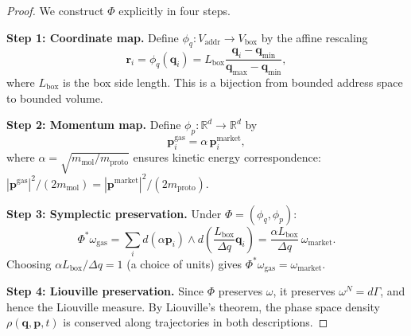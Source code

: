 \documentclass[twocolumn,10pt]{article}
\theoremstyle{remark}
\newcommand{\Vaddr}{V_{\mathrm{addr}}}
\newcommand{\mproto}{m_{\mathrm{proto}}}
\begin{document}
\begin{proof}
We construct $\Phi$ explicitly in four steps.

\textbf{Step 1: Coordinate map.}  Define $\phi_q : \Vaddr \to V_{\mathrm{box}}$ by the affine rescaling
\begin{equation}
    \mathbf{r}_i = \phi_q(\mathbf{q}_i) = L_{\mathrm{box}} \frac{\mathbf{q}_i - \mathbf{q}_{\min}}{\mathbf{q}_{\max} - \mathbf{q}_{\min}},
    \label{eq:coord_map}
\end{equation}
where $L_{\mathrm{box}}$ is the box side length.  This is a bijection from bounded address space to bounded volume.

\textbf{Step 2: Momentum map.}  Define $\phi_p : \mathbb{R}^d \to \mathbb{R}^d$ by
\begin{equation}
    \mathbf{p}_i^{\mathrm{gas}} = \alpha \, \mathbf{p}_i^{\mathrm{market}},
    \label{eq:momentum_map}
\end{equation}
where $\alpha = \sqrt{m_{\mathrm{mol}} / \mproto}$ ensures kinetic energy correspondence: $|\mathbf{p}^{\mathrm{gas}}|^2 / (2 m_{\mathrm{mol}}) = |\mathbf{p}^{\mathrm{market}}|^2 / (2\mproto)$.

\textbf{Step 3: Symplectic preservation.}  Under $\Phi = (\phi_q, \phi_p)$:
\begin{equation}
    \Phi^* \omega_{\mathrm{gas}} = \sum_i d(\alpha \mathbf{p}_i) \wedge d\!\left(\frac{L_{\mathrm{box}}}{\Delta q} \mathbf{q}_i\right) = \frac{\alpha L_{\mathrm{box}}}{\Delta q} \, \omega_{\mathrm{market}}.
\end{equation}
Choosing $\alpha L_{\mathrm{box}} / \Delta q = 1$ (a choice of units) gives $\Phi^* \omega_{\mathrm{gas}} = \omega_{\mathrm{market}}$.

\textbf{Step 4: Liouville preservation.}  Since $\Phi$ preserves $\omega$, it preserves $\omega^N = d\Gamma$, and hence the Liouville measure.  By Liouville's theorem, the phase space density $\rho(\mathbf{q}, \mathbf{p}, t)$ is conserved along trajectories in both descriptions.
\end{proof}
\end{document}
